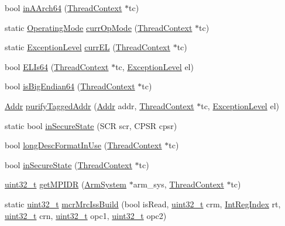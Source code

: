 \begin{DoxyCompactItemize}
\item 
bool \hyperlink{namespaceArmISA_a890c3725780f89b1092bb0a0f4adab99}{inAArch64} (\hyperlink{classThreadContext}{ThreadContext} $\ast$tc)
\item 
static \hyperlink{namespaceArmISA_ae306b3353ed3d62bb2e6de130b3c9eaa}{OperatingMode} \hyperlink{namespaceArmISA_a89bff2ee523d372c456087b77df1a43b}{currOpMode} (\hyperlink{classThreadContext}{ThreadContext} $\ast$tc)
\item 
static \hyperlink{namespaceArmISA_a16588a7a92eb985c3341b7f706c81dd5}{ExceptionLevel} \hyperlink{namespaceArmISA_a7d0efb0cabf7164c98bf8eddda31c1a8}{currEL} (\hyperlink{classThreadContext}{ThreadContext} $\ast$tc)
\item 
bool \hyperlink{namespaceArmISA_af14bc6dfe71d3be985d754e484d92b0c}{ELIs64} (\hyperlink{classThreadContext}{ThreadContext} $\ast$tc, \hyperlink{namespaceArmISA_a16588a7a92eb985c3341b7f706c81dd5}{ExceptionLevel} el)
\item 
bool \hyperlink{namespaceArmISA_aabade0b3dff9abbcdf0ded3b466c9f06}{isBigEndian64} (\hyperlink{classThreadContext}{ThreadContext} $\ast$tc)
\item 
\hyperlink{classm5_1_1params_1_1Addr}{Addr} \hyperlink{namespaceArmISA_a52481fc8af3df3627260833f83bd5a83}{purifyTaggedAddr} (\hyperlink{classm5_1_1params_1_1Addr}{Addr} addr, \hyperlink{classThreadContext}{ThreadContext} $\ast$tc, \hyperlink{namespaceArmISA_a16588a7a92eb985c3341b7f706c81dd5}{ExceptionLevel} el)
\item 
static bool \hyperlink{namespaceArmISA_a67cdf174e80dad7cea5b81cd045ba3b3}{inSecureState} (SCR scr, CPSR cpsr)
\item 
bool \hyperlink{namespaceArmISA_a17bd91b8e7ff93e8fd99d08464dcfe53}{longDescFormatInUse} (\hyperlink{classThreadContext}{ThreadContext} $\ast$tc)
\item 
bool \hyperlink{namespaceArmISA_abed19d0288e553ad67d221ac6a16a801}{inSecureState} (\hyperlink{classThreadContext}{ThreadContext} $\ast$tc)
\item 
\hyperlink{Type_8hh_a435d1572bf3f880d55459d9805097f62}{uint32\_\-t} \hyperlink{namespaceArmISA_aecf36026981db36d1bf1a541b6650621}{getMPIDR} (\hyperlink{classArmSystem}{ArmSystem} $\ast$arm\_\-sys, \hyperlink{classThreadContext}{ThreadContext} $\ast$tc)
\item 
static \hyperlink{Type_8hh_a435d1572bf3f880d55459d9805097f62}{uint32\_\-t} \hyperlink{namespaceArmISA_a9231e0af46835e612b3e5492ff29220b}{mcrMrcIssBuild} (bool isRead, \hyperlink{Type_8hh_a435d1572bf3f880d55459d9805097f62}{uint32\_\-t} crm, \hyperlink{namespaceArmISA_ae64680ba9fb526106829d6bf92fc791b}{IntRegIndex} rt, \hyperlink{Type_8hh_a435d1572bf3f880d55459d9805097f62}{uint32\_\-t} crn, \hyperlink{Type_8hh_a435d1572bf3f880d55459d9805097f62}{uint32\_\-t} opc1, \hyperlink{Type_8hh_a435d1572bf3f880d55459d9805097f62}{uint32\_\-t} opc2)

\end{DoxyCompactItemize}
